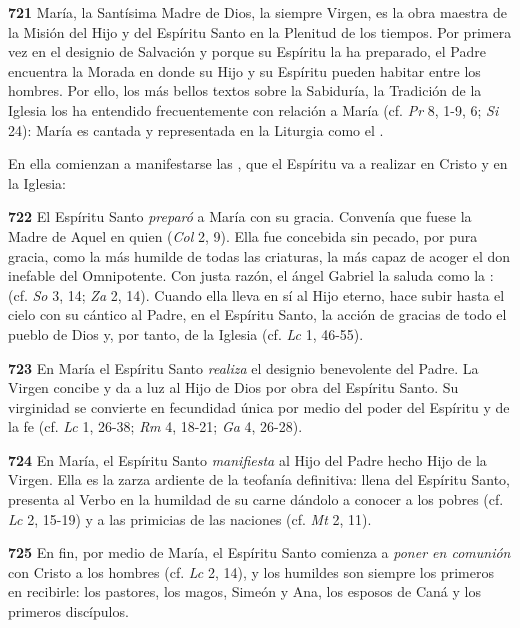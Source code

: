 \begin{body}
\begin{body}
\textbf{}

\textbf{721} María, la Santísima Madre de Dios, la siempre Virgen, es la obra maestra de la Misión del Hijo y del Espíritu Santo en la Plenitud de los tiempos. Por primera vez en el designio de Salvación y porque su Espíritu la ha preparado, el Padre encuentra la Morada en donde su Hijo y su Espíritu pueden habitar entre los hombres. Por ello, los más bellos textos sobre la Sabiduría, la Tradición de la Iglesia los ha entendido frecuentemente con relación a María (cf. \emph{Pr} 8, 1-9, 6; \emph{Si} 24): María es cantada y representada en la Liturgia como el .

En ella comienzan a manifestarse las , que el Espíritu va a realizar en Cristo y en la Iglesia:

\textbf{722} El Espíritu Santo \emph{preparó} a María con su gracia. Convenía que fuese  la Madre de Aquel en quien  (\emph{Col} 2, 9). Ella fue concebida sin pecado, por pura gracia, como la más humilde de todas las criaturas, la más capaz de acoger el don inefable del Omnipotente. Con justa razón, el ángel Gabriel la saluda como la :  (cf. \emph{So} 3, 14; \emph{Za} 2, 14). Cuando ella lleva en sí al Hijo eterno, hace subir hasta el cielo con su cántico al Padre, en el Espíritu Santo, la acción de gracias de todo el pueblo de Dios y, por tanto, de la Iglesia (cf. \emph{Lc} 1, 46-55).

\textbf{723} En María el Espíritu Santo \emph{realiza} el designio benevolente del Padre. La Virgen concibe y da a luz al Hijo de Dios por obra del Espíritu Santo. Su virginidad se convierte en fecundidad única por medio del poder del Espíritu y de la fe (cf. \emph{Lc} 1, 26-38; \emph{Rm} 4, 18-21; \emph{Ga} 4, 26-28).

\textbf{724} En María, el Espíritu Santo \emph{manifiesta} al Hijo del Padre hecho Hijo de la Virgen. Ella es la zarza ardiente de la teofanía definitiva: llena del Espíritu Santo, presenta al Verbo en la humildad de su carne dándolo a conocer a los pobres (cf. \emph{Lc} 2, 15-19) y a las primicias de las naciones (cf. \emph{Mt} 2, 11).

\textbf{725} En fin, por medio de María, el Espíritu Santo comienza a \emph{poner en comunión} con Cristo a los hombres  (cf. \emph{Lc} 2, 14), y los humildes son siempre los primeros en recibirle: los pastores, los magos, Simeón y Ana, los esposos de Caná y los primeros discípulos.


\end{body}
\end{body}
